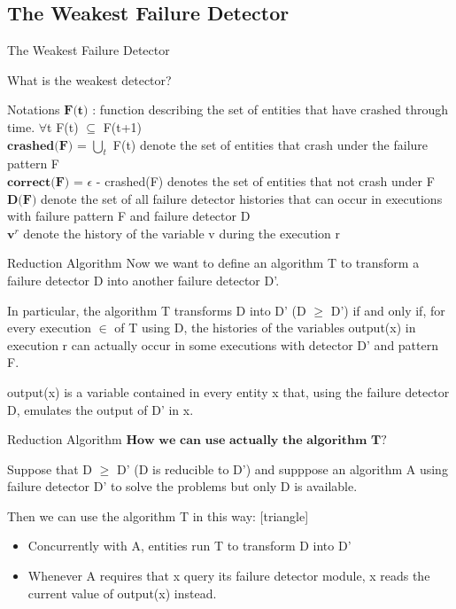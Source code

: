 \documentclass{beamer}
\begin{document}
\subsection{The Weakest Failure Detector}
\begin{frame}{The Weakest Failure Detector}
\begin{flushleft}
What is the weakest detector?
\end{flushleft}
\begin{alertblock}{Notations}
$\textbf{F(t)}$ : function describing the set of entities that have crashed through time. $\forall$t F(t) $\subseteq$ F(t+1)\\
\medskip
$\textbf{crashed(F)}$ = $\bigcup_{t}$ F(t) denote the set of entities that crash under the failure pattern F\\
\medskip
$\textbf{correct(F)}$ = $\epsilon$ - crashed(F) denotes the set of entities that not crash under F\\
\medskip
$\textbf{D(F})$ denote the set of all failure detector histories that can occur in executions with failure pattern F and failure detector D\\
\medskip
$\textbf{v}^r$ denote the history of the variable v during the execution r
\end{alertblock}
\end{frame}

\begin{frame}{Reduction Algorithm}
Now we want to define an algorithm T to transform a failure detector D into another failure detector D'.
\begin{flushleft}
\end{flushleft}
In particular, the algorithm T transforms D into D' (D $\geqslant$ D') if and only if, for every execution $\in$ of T using D, the histories of the variables output(x) in execution r can actually occur in some executions with detector D' and pattern F.
\begin{flushleft}
\end{flushleft}
output(x) is a variable contained in every entity x that, using the failure detector D, emulates the output of D' in x.
\end{frame}

\begin{frame}{Reduction Algorithm}
$\textbf{How we can use actually the algorithm T?}$
\begin{flushleft}
Suppose that D $\geqslant$ D' (D is reducible to D') and supppose an algorithm A using failure detector D' to solve the problems but only D is available.
\end{flushleft}
\begin{flushleft}
Then we can use the algorithm T in this way:
[triangle]
\begin{itemize}
\item Concurrently with A, entities run T to transform D into D'
\item Whenever A requires that x query its failure detector module, x reads the current value of output(x) instead.
\end{itemize}
\end{flushleft}
\end{frame}
\end{document}
